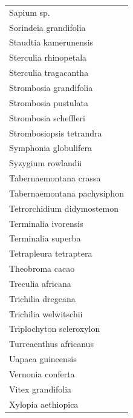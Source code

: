 \documentclass[
  12pt,
  a4paper,
  extrafontsizes,
  onecolumn,
  openright]{book}
\theoremstyle{definition}
\theoremstyle{definition}
\theoremstyle{definition}
\theoremstyle{definition}
\theoremstyle{remark}
\begin{document}
\begin{longtable}[]{@{}l@{}}
Sapium sp. \\
Sorindeia grandifolia \\
Staudtia kamerunensis \\
Sterculia rhinopetala \\
Sterculia tragacantha \\
Strombosia grandifolia \\
Strombosia pustulata \\
Strombosia scheffleri \\
Strombosiopsis tetrandra \\
Symphonia globulifera \\
Syzygium rowlandii \\
Tabernaemontana crassa \\
Tabernaemontana pachysiphon \\
Tetrorchidium didymostemon \\
Terminalia ivorensis \\
Terminalia superba \\
Tetrapleura tetraptera \\
Theobroma cacao \\
Treculia africana \\
Trichilia dregeana \\
Trichilia welwitschii \\
Triplochyton scleroxylon \\
Turreaenthus africanus \\
Uapaca guineensis \\
Vernonia conferta \\
Vitex grandifolia \\
Xylopia aethiopica \\
\bottomrule()
\end{longtable}
\end{document}
